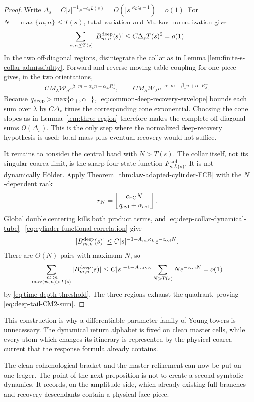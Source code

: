 \documentclass[11pt]{article}
\begin{document}
\begin{proof}
Write
$\Delta_s=C|s|^{-1}e^{-c_dL(s)}
=O(|s|^{\kappa_Lc_d-1})=o(1)$.
For $N=\max\{m,n\}\le T(s)$, total variation and Markov normalization give
\[
 \sum_{m,n\le T(s)}|B^{\rm deep}_{m,n}(s)|
 \le C\Delta_sT(s)^2=o(1).
\]
In the two off-diagonal regions, disintegrate the collar as in Lemma
\ref{lem:finite-s-collar-admissibility}.  Forward and reverse moving-table
coupling for one piece gives, in the two orientations,
\begin{align*}
 C M_\lambda\mathcal W_\lambda
 e^{\beta_-m-\alpha_+n+\alpha_+R^+_\lambda},\qquad
 C M_\lambda\mathcal W_\lambda
 e^{-\alpha_-m+\beta_+n+\alpha_-R^-_\lambda}.
\end{align*}
Because $q_{\rm deep}>\max\{\alpha_+,\alpha_-\}$,
\eqref{eq:common-deep-recovery-envelope} bounds each sum over $\lambda$ by
$C\Delta_s$ times the corresponding cone exponential.  Choosing the cone
slopes as in Lemma~\ref{lem:three-region} therefore makes the complete
off-diagonal sums $O(\Delta_s)$.  This is the only step where the normalized
deep-recovery hypothesis is used; total mass plus eventual recovery would
not suffice.

It remains to consider the central band with $N>T(s)$.  The collar itself,
not its singular coarea limit, is the sharp four-state function
$F_{s,L(s)}^{\rm col}$.  It is not dynamically H\"older.  Apply
Theorem~\ref{thm:law-adapted-cylinder-FCB} with the $N$-dependent rank
\[
 r_N=\left\lfloor
 \frac{c_{\rm FC}N}{q_{\rm cyl}+\alpha_{\rm col}}
 \right\rfloor.
\]
Global double centering kills both product terms, and
\eqref{eq:deep-collar-dynamical-tube}--
\eqref{eq:cylinder-functional-correlation} give
\[
 |B^{\rm deep}_{m,n}(s)|
 \le C|s|^{-1-A_{\rm col}\kappa_L}e^{-c_{\rm col}N}.
\]
There are $O(N)$ pairs with maximum $N$, so
\[
 \sum_{\substack{m\asymp n\\\max(m,n)>T(s)}}
 |B^{\rm deep}_{m,n}(s)|
 \le C|s|^{-1-A_{\rm col}\kappa_L}
       \sum_{N>T(s)}Ne^{-c_{\rm col}N}=o(1)
\]
by \eqref{eq:time-depth-threshold}.  The three regions exhaust the quadrant,
proving \eqref{eq:deep-tail-CM2-sum}.
\end{proof}

This construction is why a differentiable parameter family of Young towers
is unnecessary.  The dynamical return alphabet is fixed on clean master
cells, while every atom which changes its itinerary is represented by the
physical coarea current that the response formula already contains.

The clean cohomological bracket and the master refinement can now be put on one ledger.  The
point of the next proposition is not to create a second symbolic dynamics.
It records, on the amplitude side, which already existing full branches and
recovery descendants contain a physical face piece.
\end{document}
